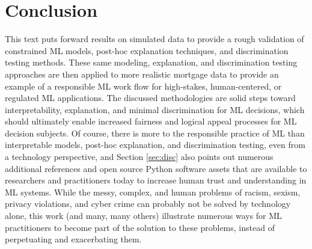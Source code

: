 \documentclass[information,article,submit,moreauthors,pdftex]{definitions/mdpi}
\begin{document}
\section{Conclusion}\label{sec:con}

This text puts forward results on simulated data to provide a rough validation of constrained ML models, post-hoc explanation techniques, and discrimination testing methods. These same modeling, explanation, and discrimination testing approaches are then applied to more realistic mortgage data to provide an example of a responsible ML work flow for high-stakes, human-centered, or regulated ML applications. The discussed methodologies are solid steps toward interpretability, explanation, and minimal discrimination for ML decisions, which should ultimately enable increased fairness and logical appeal processes for ML decision subjects. Of course, there is more to the responsible practice of ML than interpretable models, post-hoc explanation, and discrimination testing, even from a technology perspective, and Section \ref{sec:disc} also points out numerous additional references and open source Python software assets that are available to researchers and practitioners today to increase human trust and understanding in ML systems. While the messy, complex, and human problems of racism, sexism, privacy violations, and cyber crime can probably not be solved by technology alone, this work (and many, many others) illustrate numerous ways for ML practitioners to become part of the solution to these problems, instead of perpetuating and exacerbating them. 

\vspace{6pt} 

\end{document}
